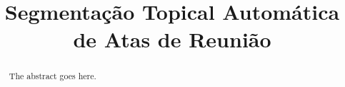 \documentclass[conference]{IEEEtran}
\begin{document}
\title{Segmentação Topical Automática de Atas de Reunião}


\author{
}



\maketitle

\begin{abstract}
The abstract goes here.
\end{abstract}

\IEEEpeerreviewmaketitle

	
	
		
	
	
	



\end{document}
